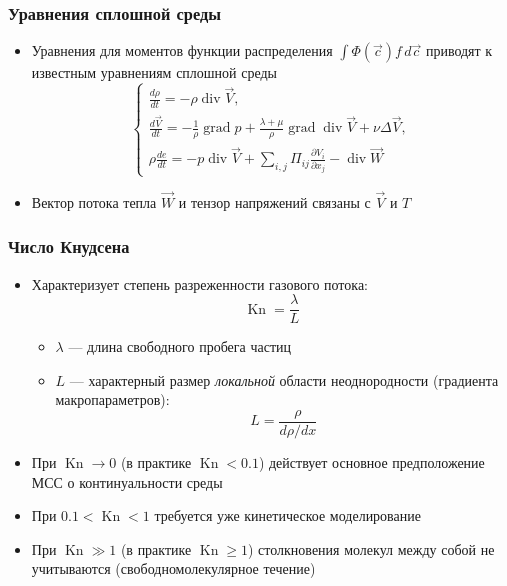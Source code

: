 \documentclass[onlymath]{beamer}
\renewcommand\geq\geqslant
\newcommand{\pardiff}[2]{\frac{\partial{#1}}{\partial{#2}}}
\DeclareMathOperator\Kn{Kn}
\DeclareMathOperator\diverg{div}
\DeclareMathOperator\gradient{grad}
\begin{document}
\begin{frame}
  \frametitle{Уравнения сплошной среды}
  
  \begin{itemize}
  \item Уравнения для моментов функции распределения
    $\int\Phi(\vec{c}) f \,d\vec{c}$ приводят к известным уравнениям
    сплошной среды
    \begin{equation*}
      \begin{cases}
        \frac{d\rho}{dt} = -\rho \diverg {\vec{V}},\\
        \frac{d\vec{V}}{dt} = -\frac{1}{\rho}\gradient{p} + \frac{\lambda
          + \mu}{\rho}\gradient\diverg\vec{V} + \nu\Delta\vec{V},\\
        \rho\frac{de}{dt} = -p\diverg\vec{V}+\sum_{i,j}{\Pi_{ij}\pardiff{V_i}{x_j}}-\diverg\vec{W}
      \end{cases}
    \end{equation*}
  \item Вектор потока тепла $\vec{W}$ и тензор напряжений связаны с
    $\vec{V}$ и $T$
  \end{itemize}
\end{frame}

\begin{frame}
  \frametitle{Число Кнудсена}

  \begin{itemize}
  \item Характеризует степень разреженности газового потока:
    \begin{equation*}
      \Kn = \frac{\lambda}{L}
    \end{equation*}
    \begin{itemize}
    \item $\lambda$ — длина свободного пробега частиц
    \item $L$ — характерный размер \emph{локальной} области
      неоднородности (градиента макропараметров):
      \begin{equation*}
        L = \frac{\rho}{d\rho / dx}
      \end{equation*}
    \end{itemize}

  \item При $\Kn \to 0$ (в практике $\Kn < 0.1$) действует основное
    предположение МСС о континуальности среды
  \item При $0.1 < \Kn < 1$ требуется уже кинетическое моделирование
  \item При $\Kn \gg 1$ (в практике $\Kn \geq 1$) столкновения молекул
    между собой не учитываются (свободномолекулярное течение)
  \end{itemize}
\end{frame}
\end{document}

